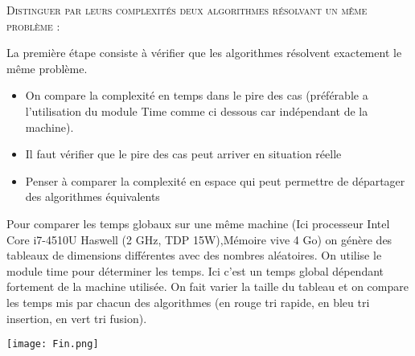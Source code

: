 
\begin{prop}

\textsc{Distinguer par leurs complexités deux algorithmes résolvant
un même problème :}

La première étape consiste à vérifier que les algorithmes résolvent exactement le même problème.

\begin{itemize}
\item On compare la complexité en temps dans le pire des cas (préférable a l'utilisation du module Time comme ci dessous car indépendant de la machine).
\item Il faut vérifier que le pire des cas peut arriver en situation réelle
\item Penser à comparer la complexité en espace qui peut permettre de départager des algorithmes équivalents
\end{itemize}
\end{prop}

\begin{exemple2}

Pour comparer les temps globaux sur une même machine (Ici processeur	Intel Core i7-4510U Haswell (2 GHz, TDP 15W),Mémoire vive 4 Go) on génère des tableaux de dimensions différentes avec des nombres aléatoires.
On utilise le module time pour déterminer les temps. Ici c'est un temps global dépendant fortement de la machine utilisée.
On fait varier la taille du tableau et on compare les temps mis par chacun des algorithmes (en rouge tri rapide, en bleu tri insertion, en vert tri fusion). 

\begin{center}
\texttt{[image: Fin.png]}
\end{center}

\end{exemple2}




\begin{thebibliography}{2}




\end{thebibliography}

